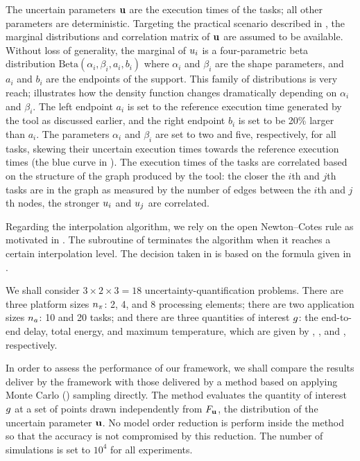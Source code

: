 
The uncertain parameters $\mathbf{u}$ are the execution times of the tasks; all other
parameters are deterministic. Targeting the practical scenario described in
, the marginal distributions and correlation matrix
of $\mathbf{u}$ are assumed to be available. Without loss of generality, the marginal
of $u_i$ is a four-parametric beta distribution $\text{Beta}(\alpha_i, \beta_i,
a_i, b_i)$ where $\alpha_i$ and $\beta_i$ are the shape parameters, and $a_i$
and $b_i$ are the endpoints of the support. This family of distributions is very
reach;  illustrates how the density function changes
dramatically depending on $\alpha_i$ and $\beta_i$. The left endpoint $a_i$ is
set to the reference execution time generated by the  tool as
discussed earlier, and the right endpoint $b_i$ is set to be 20\% larger than
$a_i$. The parameters $\alpha_i$ and $\beta_i$ are set to two and five,
respectively, for all tasks, skewing their uncertain execution times towards the
reference execution times (the blue curve in ). The execution
times of the tasks are correlated based on the structure of the graph produced
by the  tool: the closer the $i$th and $j$th tasks are in the graph
as measured by the number of edges between the $i$th and $j$th nodes, the
stronger $u_i$ and $u_j$ are correlated.

Regarding the interpolation algorithm, we rely on the open Newton--Cotes rule as
motivated in . The  subroutine of
 terminates the algorithm when it reaches a certain
interpolation level. The decision taken in  is based on the
formula given in .

We shall consider $3 \times 2 \times 3 = 18$ uncertainty-quantification
problems. There are three platform sizes ${n_\pi}$: 2, 4, and 8 processing elements;
there are two application sizes ${n_a}$: 10 and 20 tasks; and there are three
quantities of interest $g$: the end-to-end delay, total energy, and maximum
temperature, which are given by , ,
and , respectively.

In order to assess the performance of our framework, we shall compare the
results deliver by the framework with those delivered by a method based on
applying Monte Carlo () sampling directly. The  method
evaluates the quantity of interest $g$ at a set of points drawn independently
from $F_{\mathbf{u}}$, the distribution of the uncertain parameter $\mathbf{u}$. No
model order reduction is perform inside the  method so that the
accuracy is not compromised by this reduction. The number of 
simulations is set to $10^4$ for all experiments.


